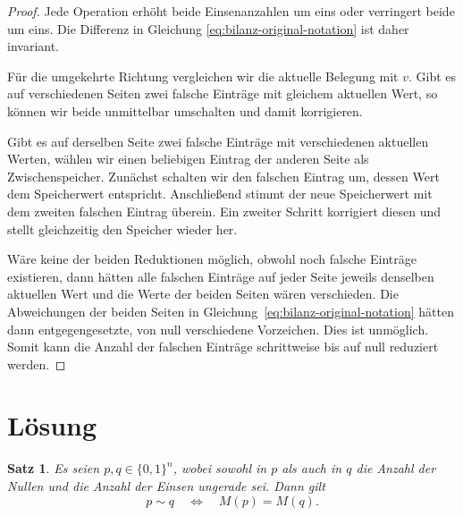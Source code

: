\documentclass[12pt]{article}
\newtheorem{thm}{Satz}
\begin{document}
\begin{proof}
Jede Operation erhöht beide Einsenanzahlen um eins oder verringert beide um
eins. Die Differenz in Gleichung
\eqref{eq:bilanz-original-notation} ist daher invariant.

Für die umgekehrte Richtung vergleichen wir die aktuelle Belegung mit $v$.
Gibt es auf verschiedenen Seiten zwei falsche Einträge mit gleichem aktuellen
Wert, so können wir beide unmittelbar umschalten und damit korrigieren.

Gibt es auf derselben Seite zwei falsche Einträge mit verschiedenen aktuellen
Werten, wählen wir einen beliebigen Eintrag der anderen Seite als
Zwischenspeicher. Zunächst schalten wir den falschen Eintrag um, dessen Wert
dem Speicherwert entspricht. Anschließend stimmt der neue Speicherwert mit
dem zweiten falschen Eintrag überein. Ein zweiter Schritt korrigiert diesen
und stellt gleichzeitig den Speicher wieder her.

Wäre keine der beiden Reduktionen möglich, obwohl noch falsche Einträge
existieren, dann hätten alle falschen Einträge auf jeder Seite jeweils
denselben aktuellen Wert und die Werte der beiden Seiten wären verschieden.
Die Abweichungen der beiden Seiten in
Gleichung~\eqref{eq:bilanz-original-notation} hätten dann entgegengesetzte,
von null verschiedene Vorzeichen. Dies ist unmöglich. Somit kann die Anzahl
der falschen Einträge schrittweise bis auf null reduziert werden.
\end{proof}

\section{Lösung}

\begin{thm}
Es seien $p,q\in\{0,1\}^n$, wobei sowohl in $p$ als auch in $q$ die Anzahl
der Nullen und die Anzahl der Einsen ungerade sei. Dann gilt
\[
p\sim q
\quad\Longleftrightarrow\quad
M(p)=M(q).
\]
\label{thm:mediansignatur-charakterisierung}
\end{thm}
\end{document}
